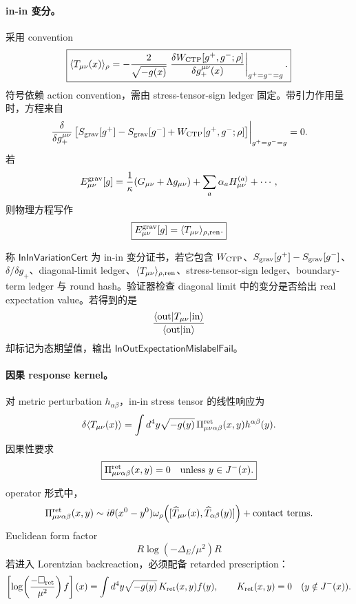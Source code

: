 \paragraph{in-in 变分。}
采用 convention
\[
\boxed{
\langle T_{\mu\nu}(x)\rangle_\rho
=
-\frac{2}{\sqrt{-g(x)}}
\left.
\frac{\delta W_{\rm CTP}[g^+,g^-;\rho]}
{\delta g_+^{\mu\nu}(x)}
\right|_{g^+=g^-=g}.
}
\]
符号依赖 action convention，需由 stress-tensor-sign ledger 固定。带引力作用量时，方程来自
\[
\left.
\frac{\delta}{\delta g_+^{\mu\nu}}
\left[
S_{\rm grav}[g^+]-S_{\rm grav}[g^-]
+W_{\rm CTP}[g^+,g^-;\rho]
\right]
\right|_{g^+=g^-=g}
=0.
\]
若
\[
E_{\mu\nu}^{\rm grav}[g]
=
\frac{1}{\kappa}(G_{\mu\nu}+\Lambda g_{\mu\nu})
+\sum_a\alpha_aH_{\mu\nu}^{(a)}+\cdots,
\]
则物理方程写作
\[
\boxed{
E_{\mu\nu}^{\rm grav}[g]
=
\langle T_{\mu\nu}\rangle_{\rho,{\rm ren}}.
}
\]

\begin{definition}[in-in 变分证书]\label{def:typed-address-biaxial-completion-in-in-variation-cert}
称 \(\mathsf{InInVariationCert}\) 为 in-in 变分证书，若它包含 \(W_{\rm CTP}\)、\(S_{\rm grav}[g^+]-S_{\rm grav}[g^-]\)、\(\delta/\delta g_+\)、diagonal-limit ledger、\(\langle T_{\mu\nu}\rangle_{\rho,{\rm ren}}\)、stress-tensor-sign ledger、boundary-term ledger 与 round hash。验证器检查 diagonal limit 中的变分是否给出 real expectation value。若得到的是
\[
\frac{\langle{\rm out}|T_{\mu\nu}|{\rm in}\rangle}{\langle{\rm out}|{\rm in}\rangle}
\]
却标记为态期望值，输出 \(\mathsf{InOutExpectationMislabelFail}\)。
\end{definition}

\paragraph{因果 response kernel。}
对 metric perturbation \(h_{\alpha\beta}\)，in-in stress tensor 的线性响应为
\[
\delta\langle T_{\mu\nu}(x)\rangle
=
\int d^4y\sqrt{-g(y)}\,
\Pi^{\rm ret}_{\mu\nu\alpha\beta}(x,y)
h^{\alpha\beta}(y).
\]
因果性要求
\[
\boxed{
\Pi^{\rm ret}_{\mu\nu\alpha\beta}(x,y)=0
\quad\text{unless }y\in J^-(x).
}
\]
operator 形式中，
\[
\Pi^{\rm ret}_{\mu\nu\alpha\beta}(x,y)
\sim
i\theta(x^0-y^0)
\omega_\rho\!\left(
[\widehat T_{\mu\nu}(x),\widehat T_{\alpha\beta}(y)]
\right)
+\text{contact terms}.
\]
Euclidean form factor
\[
R\log(-\Delta_E/\mu^2)R
\]
若进入 Lorentzian backreaction，必须配备 retarded prescription：
\[
\left[
\log\!\left(\frac{-\Box_{\rm ret}}{\mu^2}\right)f
\right](x)
=
\int d^4y\sqrt{-g(y)}\,K_{\rm ret}(x,y)f(y),
\qquad
K_{\rm ret}(x,y)=0\quad (y\notin J^-(x)).
\]

